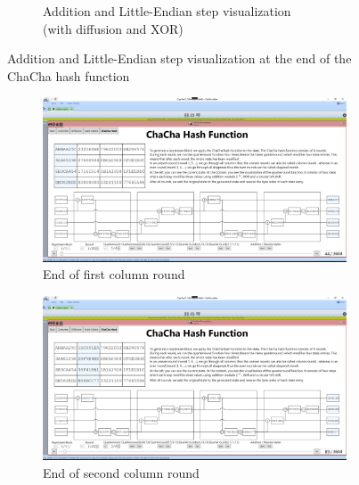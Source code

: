 \begin{figure}
\begin{subfigure}[t]{0.5\textwidth}
  \caption{Addition and Little-Endian step visualization\\(with diffusion and XOR)}
\label{fig:chachahash.end.with.diffusion.xor}
\end{subfigure}
\caption[Addition and Little-Endian step visualization]{Addition and Little-Endian step visualization at the end of the ChaCha hash function}
\label{fig:chachahash.end}
\end{figure}

\begin{figure}
\centering
\begin{subfigure}{0.5\textwidth}
  \centering
  \includegraphics[width=0.99\textwidth]{figures/ct2/chachahash/chachahash-cr1-end.png}
  \caption{End of first column round}
  \label{fig:chachahash.cr.1}
\end{subfigure}%
\begin{subfigure}{0.5\textwidth}
  \centering
  \includegraphics[width=0.99\textwidth]{figures/ct2/chachahash/chachahash-cr2-end.png}
  \caption{End of second column round}
  \label{fig:chachahash.cr.2}
\end{subfigure}
\begin{subfigure}{0.5\textwidth}

\end{subfigure}
\end{figure}

